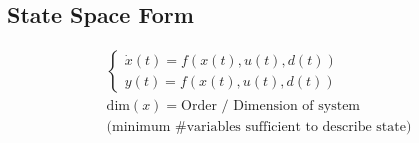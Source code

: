 \subsection{State Space Form}
    \begin{align*}
        \begin{cases}
            \dot{x}(t) = f(x(t), u(t), d(t))\\
            y(t) = f(x(t), u(t), d(t))
        \end{cases}\\
        \text{dim}(x) = \text{Order / Dimension of system}\\ 
        \text{(minimum \# variables sufficient to describe state)}
    \end{align*}
    